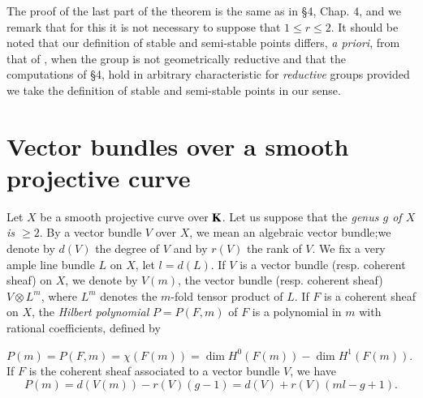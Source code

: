The proof of the last part of the theorem is the same as in \S4, Chap. 4, \cite{art18-key5} and we remark that for this it is not necessary to suppose that $1\leq r\leq 2$. It should be noted that our definition of stable and semi-stable points differs, {\em a priori}, from that of \cite{art18-key4}, when the group is not geometrically reductive and that the computations of \S4, \cite{art18-key4} hold in arbitrary characteristic for {\em reductive} groups provided we take the definition of stable and semi-stable points in our sense.

\section{Vector bundles over a smooth projective curve}\label{art18-sec3}

Let $X$ be a smooth projective curve over $\mathbf{K}$. Let us suppose that the {\em genus $g$ of $X$ is $\geq 2$}. By a vector bundle $V$ over $X$, we mean an algebraic vector bundle;\pageoriginale we denote by $d(V)$ the degree of $V$ and by $r(V)$ the rank of $V$. We fix a very ample line bundle $L$ on $X$, let $l=d(L)$. If $V$ is a vector bundle (resp. coherent sheaf) on $X$, we denote by $V(m)$, the vector bundle (resp. coherent sheaf) $V\otimes L^{m}$, where $L^{m}$ denotes the $m$-fold tensor product of $L$. If $F$ is a coherent sheaf on $X$, the {\em Hilbert polynomial} $P=P(F,m)$ of $F$ is a polynomial in $m$ with rational coefficients, defined by

$P(m)=P(F,m)=\chi(F(m))=\dim H^{0}(F(m))-\dim H^{1}(F(m))$. If $F$ is the coherent sheaf associated to a vector bundle $V$, we have
$$
P(m)=d(V(m))-r(V)(g-1)=d(V)+r(V)(ml-g+1).
$$

